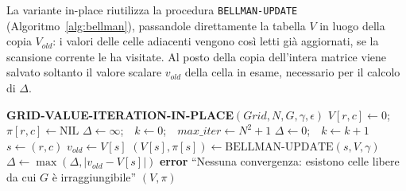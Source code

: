 \noindent
La variante in-place riutilizza la procedura \texttt{BELLMAN-UPDATE} (Algoritmo~\ref{alg:bellman}), passandole direttamente la tabella $V$ in luogo della copia $V_{old}$: i valori delle celle adiacenti vengono così letti già aggiornati, se la scansione corrente le ha visitate. Al posto della copia dell'intera matrice viene salvato soltanto il valore scalare $v_{old}$ della cella in esame, necessario per il calcolo di $\Delta$.

\begin{algorithm}[H]
\caption{Calcolo del valore di una soluzione ottima (variante in-place)}
\label{alg:gvi-inplace}
\begin{algorithmic}[1]
\Statex \textbf{GRID-VALUE-ITERATION-IN-PLACE}$(Grid, N, G, \gamma, \epsilon)$
 \label{gvip:init-start}
        \State \Do $V[r, c] \gets 0$;\ \ $\pi[r, c] \gets \text{NIL}$
    \EndDoFor
\EndFor
\State $\Delta \gets \infty$;\ \ $k \gets 0$;\ \ $max\_iter \gets N^2 + 1$ \label{gvip:init-end}
 \label{gvip:while}
    \State \Do $\Delta \gets 0$;\ \ $k \gets k + 1$
     \label{gvip:scan}
            \State \Do $s \gets (r, c)$
                \State \Then $v_{old} \gets V[s]$ \label{gvip:vold}
                \State $(V[s], \pi[s]) \gets \text{BELLMAN-UPDATE}(s, V, \gamma)$ \label{gvip:update}
                \State $\Delta \gets \max(\Delta, |v_{old} - V[s]|)$ \label{gvip:while-end}
            \EndIf
        \EndDoFor
    \EndFor
\EndWhile
\If{$\Delta \ge \epsilon$}
    \State \Then \textbf{error} ``Nessuna convergenza: esistono celle libere da cui $G$ è irraggiungibile''
\EndIf
\State \Return $(V, \pi)$
\end{algorithmic}
\end{algorithm}
